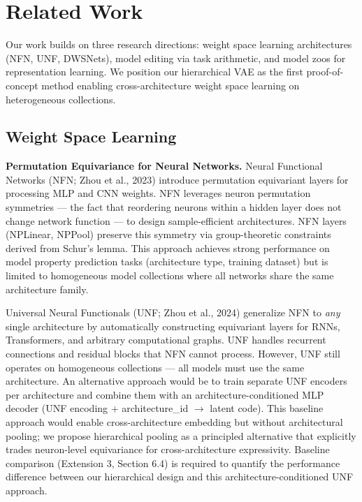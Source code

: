\section{Related Work}

Our work builds on three research directions: weight space learning architectures (NFN, UNF, DWSNets), model editing via task arithmetic, and model zoos for representation learning. We position our hierarchical VAE as the first proof-of-concept method enabling cross-architecture weight space learning on heterogeneous collections.

\subsection{Weight Space Learning}

\textbf{Permutation Equivariance for Neural Networks.} Neural Functional Networks (NFN; Zhou et al., 2023) introduce permutation equivariant layers for processing MLP and CNN weights. NFN leverages neuron permutation symmetries --- the fact that reordering neurons within a hidden layer does not change network function --- to design sample-efficient architectures. NFN layers (NPLinear, NPPool) preserve this symmetry via group-theoretic constraints derived from Schur's lemma. This approach achieves strong performance on model property prediction tasks (architecture type, training dataset) but is limited to homogeneous model collections where all networks share the same architecture family.

Universal Neural Functionals (UNF; Zhou et al., 2024) generalize NFN to \textit{any} single architecture by automatically constructing equivariant layers for RNNs, Transformers, and arbitrary computational graphs. UNF handles recurrent connections and residual blocks that NFN cannot process. However, UNF still operates on homogeneous collections --- all models must use the same architecture. An alternative approach would be to train separate UNF encoders per architecture and combine them with an architecture-conditioned MLP decoder (UNF encoding + architecture\_id $\rightarrow$ latent code). This baseline approach would enable cross-architecture embedding but without architectural pooling; we propose hierarchical pooling as a principled alternative that explicitly trades neuron-level equivariance for cross-architecture expressivity. Baseline comparison (Extension 3, Section 6.4) is required to quantify the performance difference between our hierarchical design and this architecture-conditioned UNF approach.

